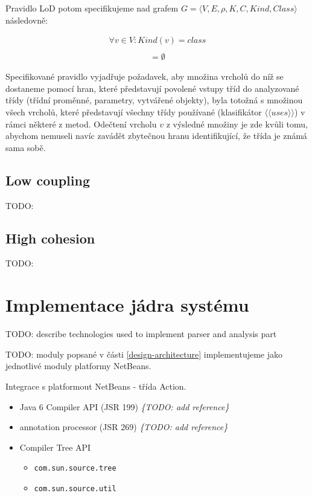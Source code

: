 Pravidlo LoD potom specifikujeme nad grafem $G = \langle V, E, \rho, K, C, \mathit{Kind}, \mathit{Class}\rangle$ následovně:

\begin{align*}
\forall v \in V: Kind(v) = class\\
\end{align*}
\begin{align*}
[((&F(G, v, class, \langle\langle{}has\_field\rangle\rangle{}) \cup F(G, v, class, \langle\langle{}has\_param\rangle\rangle{}) \cup\\
&F(G, v, class, \langle\langle{}instantiates\rangle\rangle{})) \cap F(v, class, \langle\langle{}uses\rangle\rangle{}) \setminus \{v\}] = \emptyset
\end{align*}

Specifikované pravidlo vyjadřuje požadavek, aby množina vrcholů do níž se dostaneme pomocí hran, které představují povolené vstupy tříd do analyzované třídy (třídní proměnné, parametry, vytvářené objekty), byla totožná s množinou všech vrcholů, které představují všechny třídy používané (klasifikátor $\langle\langle{}uses\rangle\rangle$) v rámci některé z metod. Odečtení vrcholu $v$ z výsledné množiny je zde kvůli tomu, abychom nemuseli navíc zavádět zbytečnou hranu identifikující, že třída je známá sama sobě.

\subsection{Low coupling}
TODO:

\subsection{High cohesion}
TODO:

\section{Implementace jádra systému}
TODO: describe technologies used to implement parser and analysis part

TODO: moduly popsané v části \ref{design-architecture} implementujeme jako jednotlivé moduly platformy NetBeans.

Integrace s platformout NetBeans - třída Action.

\begin{itemize}
\item Java 6 Compiler API (JSR 199) \emph{\{TODO: add reference\}}
\item annotation processor (JSR 269) \emph{\{TODO: add reference\}}
\item Compiler Tree API
  \begin{itemize}
  \item \verb+com.sun.source.tree+
  \item \verb+com.sun.source.util+
  \end{itemize}
\end{itemize}

